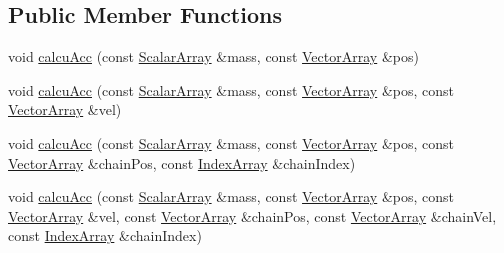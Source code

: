\subsection*{Public Member Functions}
\begin{DoxyCompactItemize}
\item 
void \mbox{\hyperlink{struct_space_h_1_1_empty_force_a83468f94ac05624de3f8e492f3171560}{calcu\+Acc}} (const \mbox{\hyperlink{struct_space_h_1_1_empty_force_afdeb66410650cdb1e2e3b1e1fd79540c}{Scalar\+Array}} \&mass, const \mbox{\hyperlink{struct_space_h_1_1_empty_force_a06ad868879a6fa5def9c7f9fd75fffde}{Vector\+Array}} \&pos)
\item 
void \mbox{\hyperlink{struct_space_h_1_1_empty_force_af5373ca3798b19d9b4eb155c3fe7cf46}{calcu\+Acc}} (const \mbox{\hyperlink{struct_space_h_1_1_empty_force_afdeb66410650cdb1e2e3b1e1fd79540c}{Scalar\+Array}} \&mass, const \mbox{\hyperlink{struct_space_h_1_1_empty_force_a06ad868879a6fa5def9c7f9fd75fffde}{Vector\+Array}} \&pos, const \mbox{\hyperlink{struct_space_h_1_1_empty_force_a06ad868879a6fa5def9c7f9fd75fffde}{Vector\+Array}} \&vel)
\item 
void \mbox{\hyperlink{struct_space_h_1_1_empty_force_aef0a45bc07150151ac18c6e180784e56}{calcu\+Acc}} (const \mbox{\hyperlink{struct_space_h_1_1_empty_force_afdeb66410650cdb1e2e3b1e1fd79540c}{Scalar\+Array}} \&mass, const \mbox{\hyperlink{struct_space_h_1_1_empty_force_a06ad868879a6fa5def9c7f9fd75fffde}{Vector\+Array}} \&pos, const \mbox{\hyperlink{struct_space_h_1_1_empty_force_a06ad868879a6fa5def9c7f9fd75fffde}{Vector\+Array}} \&chain\+Pos, const \mbox{\hyperlink{struct_space_h_1_1_empty_force_a25e0bd933dd3715e315c1abdb6843c36}{Index\+Array}} \&chain\+Index)
\item 
void \mbox{\hyperlink{struct_space_h_1_1_empty_force_a60c8642978737f561503d41d3dee90d7}{calcu\+Acc}} (const \mbox{\hyperlink{struct_space_h_1_1_empty_force_afdeb66410650cdb1e2e3b1e1fd79540c}{Scalar\+Array}} \&mass, const \mbox{\hyperlink{struct_space_h_1_1_empty_force_a06ad868879a6fa5def9c7f9fd75fffde}{Vector\+Array}} \&pos, const \mbox{\hyperlink{struct_space_h_1_1_empty_force_a06ad868879a6fa5def9c7f9fd75fffde}{Vector\+Array}} \&vel, const \mbox{\hyperlink{struct_space_h_1_1_empty_force_a06ad868879a6fa5def9c7f9fd75fffde}{Vector\+Array}} \&chain\+Pos, const \mbox{\hyperlink{struct_space_h_1_1_empty_force_a06ad868879a6fa5def9c7f9fd75fffde}{Vector\+Array}} \&chain\+Vel, const \mbox{\hyperlink{struct_space_h_1_1_empty_force_a25e0bd933dd3715e315c1abdb6843c36}{Index\+Array}} \&chain\+Index)
\item 

\end{DoxyCompactItemize}
